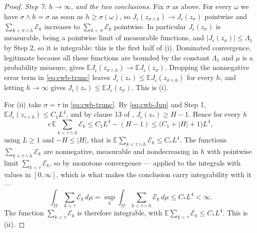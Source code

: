 \begin{proof}
\emph{Step 7: $h\to\infty$, and the two conclusions.}
Fix $\sigma$ as above. For every $\omega$ we have $\sigma\wedge h=\sigma$ as
soon as $h\ge\sigma(\omega)$, so $J_\epsilon(z_{\sigma\wedge h})\to
J_\epsilon(z_\sigma)$ pointwise and $\sum_{k<\sigma\wedge h}\mathcal E_k$
increases to $\sum_{k<\sigma}\mathcal E_k$ pointwise. In particular
$J_\epsilon(z_\sigma)$ is measurable, being a pointwise limit of measurable
functions, and $|J_\epsilon(z_\sigma)|\le\Lambda_1$ by Step 2, so it is
integrable: this is the first half of (i). Dominated convergence, legitimate
because all these functions are bounded by the constant $\Lambda_1$ and $\mu$ is
a probability measure, gives
$\mathbb E J_\epsilon(z_{\sigma\wedge h})\to\mathbb E J_\epsilon(z_\sigma)$.
Dropping the nonnegative error term in \eqref{eq:cwb-trunc} leaves
$J_\epsilon(z_*)\le\mathbb E J_\epsilon(z_{\sigma\wedge h})$ for every $h$, and
letting $h\to\infty$ gives $J_\epsilon(z_*)\le\mathbb E J_\epsilon(z_\sigma)$.
This is (i).

For (ii) take $\sigma=\tau$ in \eqref{eq:cwb-trunc}. By \eqref{eq:cwb-Jup} and
Step 1, $\mathbb E J_\epsilon(z_{\tau\wedge h})\le C_1L^4$, and by clause 13 of
, $J_\epsilon(z_*)\ge H-1$. Hence for every $h$
\[
  c\,\mathbb E\sum_{k<\tau\wedge h}\mathcal E_k
   \le C_1L^4-(H-1)\le\bigl(C_1+|H|+1\bigr)L^4 ,
\]
using $L\ge1$ and $-H\le|H|$, that is
$\mathbb E\sum_{k<\tau\wedge h}\mathcal E_k\le C_*L^4$. The functions
$\sum_{k<\tau\wedge h}\mathcal E_k$ are nonnegative, measurable and
nondecreasing in $h$ with pointwise limit $\sum_{k<\tau}\mathcal E_k$, so by
monotone convergence --- applied to the integrals with values in $[0,\infty]$,
which is what makes the conclusion carry integrability with it ---
\[
  \int_\Omega\sum_{k<\tau}\mathcal E_k\,d\mu
   =\sup_h\int_\Omega\sum_{k<\tau\wedge h}\mathcal E_k\,d\mu\le C_*L^4<\infty .
\]
The function $\sum_{k<\tau}\mathcal E_k$ is therefore integrable, with
$\mathbb E\sum_{k<\tau}\mathcal E_k\le C_*L^4$. This is (ii). \end{proof}
